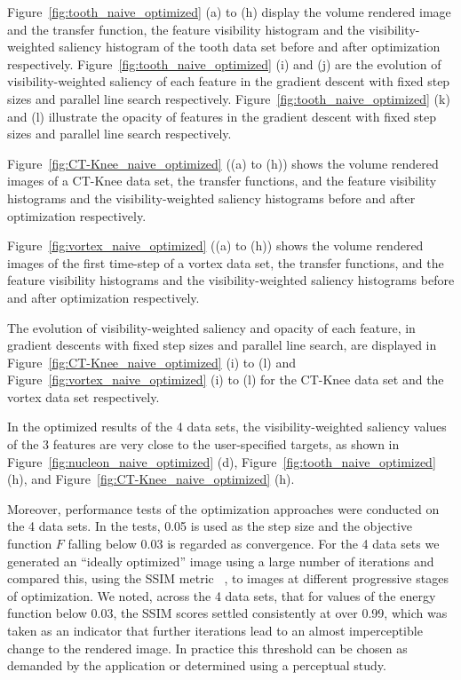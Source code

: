 Figure~\ref{fig:tooth_naive_optimized} (a) to (h) display the volume rendered image and the transfer function, the feature visibility histogram and the visibility-weighted saliency histogram of the tooth data set before and after optimization respectively.
Figure~\ref{fig:tooth_naive_optimized} (i) and (j) are the evolution of visibility-weighted saliency of each feature in the gradient descent with fixed step sizes and parallel line search respectively. Figure~\ref{fig:tooth_naive_optimized} (k) and (l) illustrate the opacity of features in the gradient descent with fixed step sizes and parallel line search respectively.

Figure~\ref{fig:CT-Knee_naive_optimized} ((a) to (h)) shows the volume rendered images of a CT-Knee data set, the transfer functions, and the feature visibility histograms and the visibility-weighted saliency histograms before and after optimization respectively.

Figure~\ref{fig:vortex_naive_optimized} ((a) to (h)) shows the volume rendered images of the first time-step of a vortex data set, the transfer functions, and the feature visibility histograms and the visibility-weighted saliency histograms before and after optimization respectively.

The evolution of visibility-weighted saliency and opacity of each feature, in gradient descents with fixed step sizes and parallel line search, are displayed in Figure~\ref{fig:CT-Knee_naive_optimized} (i) to (l) and Figure~\ref{fig:vortex_naive_optimized} (i) to (l) for the CT-Knee data set and the vortex data set respectively.

In the optimized results of the 4 data sets, the visibility-weighted saliency values of the 3 features are very close to the user-specified targets, as shown in Figure~\ref{fig:nucleon_naive_optimized} (d), Figure~\ref{fig:tooth_naive_optimized} (h), and Figure~\ref{fig:CT-Knee_naive_optimized} (h).


Moreover, performance tests of the optimization approaches were conducted on the 4 data sets. In the tests, 0.05 is used as the step size and the objective function $ F $ falling below 0.03 is regarded as convergence. For the 4 data sets we generated an ``ideally optimized'' image using a large number of iterations and compared this, using the SSIM metric ~\cite{Wang2004SSIM}, to images at different progressive stages of optimization. We noted, across the 4 data sets, that for values of the energy function below 0.03, the SSIM scores settled consistently at over 0.99, which was taken as an indicator that further iterations lead to an almost imperceptible change to the rendered image. In practice this threshold can be chosen as demanded by the application or determined using a perceptual study.

